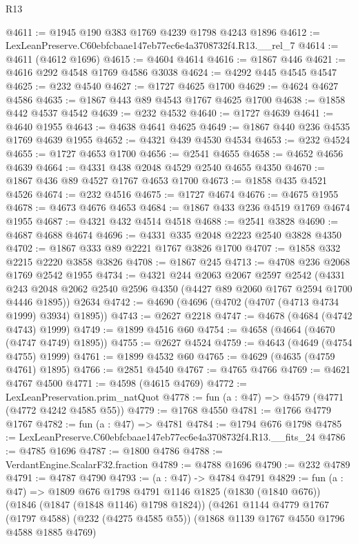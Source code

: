\begin{lexlean}{R13}
\begin{coremodule}
@4611 := @1945 @190 @383 @1769 @4239 @1798 @4243 @1896
@4612 := LexLeanPreserve.C60ebfcbaae147eb77ec6e4a3708732f4.R13.__rel_7
@4614 := @4611 (@4612 @1696)
@4615 := @4604 @4614
@4616 := @1867 @446
@4621 := @4616 @292 @4548 @1769 @4586 @3038
@4624 := @4292 @445 @4545 @4547
@4625 := @232 @4540
@4627 := @1727 @4625 @1700
@4629 := @4624 @4627 @4586
@4635 := @1867 @443 @89 @4543 @1767 @4625 @1700
@4638 := @1858 @442 @4537 @4542
@4639 := @232 @4532
@4640 := @1727 @4639
@4641 := @4640 @1955
@4643 := @4638 @4641 @4625
@4649 := @1867 @440 @236 @4535 @1769 @4639 @1955
@4652 := @4321 @439 @4530 @4534
@4653 := @232 @4524
@4655 := @1727 @4653 @1700
@4656 := @2541 @4655
@4658 := @4652 @4656 @4639
@4664 := @4331 @438 @2048 @4529 @2540 @4655 @4350
@4670 := @1867 @436 @89 @4527 @1767 @4653 @1700
@4673 := @1858 @435 @4521 @4526
@4674 := @232 @4516
@4675 := @1727 @4674
@4676 := @4675 @1955
@4678 := @4673 @4676 @4653
@4684 := @1867 @433 @236 @4519 @1769 @4674 @1955
@4687 := @4321 @432 @4514 @4518
@4688 := @2541 @3828
@4690 := @4687 @4688 @4674
@4696 := @4331 @335 @2048 @2223 @2540 @3828 @4350
@4702 := @1867 @333 @89 @2221 @1767 @3826 @1700
@4707 := @1858 @332 @2215 @2220 @3858 @3826
@4708 := @1867 @245
@4713 := @4708 @236 @2068 @1769 @2542 @1955
@4734 := @4321
    @244
    @2063
    @2067
    @2597
    @2542
    (@4331 @243 @2048 @2062 @2540 @2596 @4350 (@4427 @89 @2060 @1767 @2594 @1700 @4446 @1895))
    @2634
@4742 := @4690 (@4696 (@4702 (@4707 (@4713 @4734 @1999) @3934) @1895))
@4743 := @2627 @2218
@4747 := @4678 (@4684 (@4742 @4743) @1999)
@4749 := @1899 @4516 @60
@4754 := @4658 (@4664 (@4670 (@4747 @4749) @1895))
@4755 := @2627 @4524
@4759 := @4643 (@4649 (@4754 @4755) @1999)
@4761 := @1899 @4532 @60
@4765 := @4629 (@4635 (@4759 @4761) @1895)
@4766 := @2851 @4540
@4767 := @4765 @4766
@4769 := @4621 @4767 @4500
@4771 := @4598 (@4615 @4769)
@4772 := LexLeanPreservation.prim_natQuot
@4778 := fun (a : @47) => @4579 (@4771 (@4772 @4242 @4585 @55))
@4779 := @1768 @4550
@4781 := @1766 @4779 @1767
@4782 := fun (a : @47) => @4781
@4784 := @1794 @676 @1798
@4785 := LexLeanPreserve.C60ebfcbaae147eb77ec6e4a3708732f4.R13.__fits_24
@4786 := @4785 @1696
@4787 := @1800 @4786
@4788 := VerdantEngine.ScalarF32.fraction
@4789 := @4788 @1696
@4790 := @232 @4789
@4791 := @4787 @4790
@4793 := (a : @47) -> @4784 @4791
@4829 := fun (a : @47) =>
  @1809
    @676
    @1798
    @4791
    @1146
    @1825
    (@1830 (@1840 @676))
    (@1846 (@1847 (@1848 @1146) @1798 @1824))
    (@4261
      @1144
      @4779
      @1767
      (@1797 @4588)
      (@232 (@4275 @4585 @55))
      (@1868 @1139 @1767 @4550 @1796 @4588 @1885 @4769)

\end{coremodule}
\end{lexlean}
